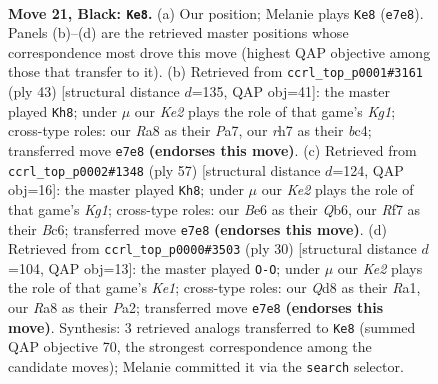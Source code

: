 \documentclass[11pt]{article}
\begin{document}
\clearpage

\begin{figure}[p]\centering
\begin{subfigure}{0.46\textwidth}\centering
\resizebox{\linewidth}{!}{%
\newchessgame
\chessboard[
  setfen={rn1q4/pp2kr1R/4bQp1/2b3P1/P7/2N2N2/1P3P2/R1B1KB2 b Q - 4 21},
  showmover=false,
  pgfstyle=straightmove, color=movearrow, markmove={e7-e8}
]}
\caption{}
\end{subfigure}\hfill
\begin{subfigure}{0.46\textwidth}\centering
\resizebox{\linewidth}{!}{%
\newchessgame
\chessboard[
  setfen={r2q2k1/p5b1/2n1Q2p/2p1P3/P1B2r2/1p6/1P3P1P/R2N1RK1 b - - 0 22},
  showmover=false,
  pgfstyle=straightmove, color=movearrow, markmove={g8-h8}
]}
\caption{}
\end{subfigure}
\\[4pt]
\begin{subfigure}{0.46\textwidth}\centering
\resizebox{\linewidth}{!}{%
\newchessgame
\chessboard[
  setfen={1r4k1/6p1/1qb1R2r/5Pbp/n1B1P3/1N5Q/1PP4P/1K1R4 b - - 2 29},
  showmover=false,
  pgfstyle=straightmove, color=movearrow, markmove={g8-h8}
]}
\caption{}
\end{subfigure}\hfill
\begin{subfigure}{0.46\textwidth}\centering
\resizebox{\linewidth}{!}{%
\newchessgame
\chessboard[
  setfen={r1b1r1k1/pp3ppp/5n2/8/3q4/1P1B4/P1Q1NPPP/R3K2R w KQ - 0 16},
  showmover=false,
  pgfstyle=straightmove, color=movearrow, markmove={e1-g1}
]}
\caption{}
\end{subfigure}
\caption{\textbf{Move 21, Black: \texttt{Ke8}.} (a) Our position; Melanie plays \texttt{Ke8} (\texttt{e7e8}). Panels (b)--(d) are the retrieved master positions whose correspondence most drove this move (highest QAP objective among those that transfer to it). (b) Retrieved from \texttt{ccrl\_top\_p0001\#3161} (ply 43) [structural distance $d$=135, QAP obj=41]: the master played \texttt{Kh8}; under $\mu$ our \emph{Ke2} plays the role of that game's \emph{Kg1}; cross-type roles: our \emph{R}a8 as their \emph{P}a7, our \emph{r}h7 as their \emph{b}c4; transferred move \texttt{e7e8} \textbf{(endorses this move)}. (c) Retrieved from \texttt{ccrl\_top\_p0002\#1348} (ply 57) [structural distance $d$=124, QAP obj=16]: the master played \texttt{Kh8}; under $\mu$ our \emph{Ke2} plays the role of that game's \emph{Kg1}; cross-type roles: our \emph{B}e6 as their \emph{Q}b6, our \emph{R}f7 as their \emph{B}c6; transferred move \texttt{e7e8} \textbf{(endorses this move)}. (d) Retrieved from \texttt{ccrl\_top\_p0000\#3503} (ply 30) [structural distance $d$=104, QAP obj=13]: the master played \texttt{O-O}; under $\mu$ our \emph{Ke2} plays the role of that game's \emph{Ke1}; cross-type roles: our \emph{Q}d8 as their \emph{R}a1, our \emph{R}a8 as their \emph{P}a2; transferred move \texttt{e7e8} \textbf{(endorses this move)}. Synthesis: 3 retrieved analogs transferred to \texttt{Ke8} (summed QAP objective 70, the strongest correspondence among the candidate moves); Melanie committed it via the \texttt{search} selector.}
\label{fig:thought-m41}
\end{figure}
\end{document}
